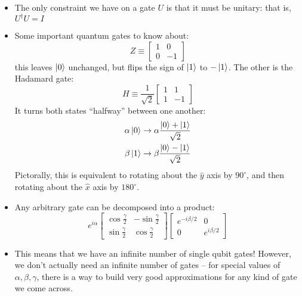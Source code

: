 \begin{itemize}
	\item The only constraint we have on a gate \( U \) is that it must be unitary: that is, \( U^\dagger U = I\) 
	\item Some important quantum gates to know about: 
		\[
			Z \equiv \begin{bmatrix} 1 & 0 \\ 0 & -1 \end{bmatrix} 
		\] 
		this leaves \( \ket{0} \) unchanged, but flips the sign of \( \ket{1}  \) to \( -\ket{1} \). The 
		other is the Hadamard gate:
		\[
			H \equiv \frac{1}{\sqrt{2} }\begin{bmatrix} 1 & 1 \\1 & -1 \end{bmatrix} 
		\] 
		It turns both states ``halfway'' between one another:
		\begin{align*}
			\alpha \ket{0} &\to \alpha \frac{\ket{0} + \ket{1}}{\sqrt{2} } \\
			\beta \ket{1} &\to \beta\frac{\ket{0} - \ket{1}}{\sqrt{2} }
		\end{align*} 
		Pictorally, this is equivalent to rotating about the \( \hat{y} \) axis by \( 90^\circ \), and 
		then rotating about the \( \hat{x} \) axis by \( 180^\circ \).
	\item Any arbitrary gate can be decomposed into a product:
		\[
			e^{i\alpha}\begin{bmatrix} \cos \frac{\gamma}{2}  & - \sin \frac{\gamma}{2} \\ \sin \frac{\gamma}{2}
			& \cos \frac{\gamma}{2}\end{bmatrix} \begin{bmatrix} e^{-i \beta / 2} & 0 \\
			0 & e^{i\beta / 2}\end{bmatrix} 
		\] 
	\item This means that we have an infinite number of single qubit gates! However, we don't actually need 
		an infinite number of gates -- for special values of \( \alpha, \beta, \gamma \), there is a way 
		to build very good approximations for any kind of gate we come across.  
\end{itemize}

